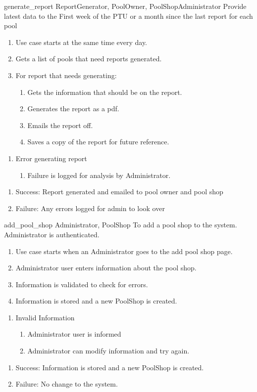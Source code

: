 \usecase
{generate\_report}
{ReportGenerator, PoolOwner, PoolShopAdministrator}
{Provide latest data to the }
{First week of the PTU or a month since the last report for each pool}
{
\begin{enumerate}
\item Use case starts at the same time every day.
\item Gets a list of pools that need reports generated.
\item For report that needs generating:
\begin{enumerate}
\item Gets the information that should be on the report.
\item Generates the report as a pdf.
\item Emails the report off.
\item Saves a copy of the report for future reference.
\end{enumerate}
\end{enumerate}
}
{
\begin{enumerate}
\item Error generating report
\begin{enumerate}
\item Failure is logged for analysis by Administrator.
\end{enumerate}
\end{enumerate}
}
{
\begin{enumerate}
\item Success: Report generated and emailed to pool owner and pool shop
\item Failure: Any errors logged for admin to look over
\end{enumerate}
}

\usecase
{add\_pool\_shop}
{Administrator, PoolShop}
{To add a pool shop to the system.}
{Administrator is authenticated.}
{
\begin{enumerate}
\item Use case starts when an Administrator goes to the add pool shop page.
\item Administrator user enters information about the pool shop.
\item Information is validated to check for errors.
\item Information is stored and a new PoolShop is created.
\end{enumerate}
}
{
\begin{enumerate}
\item Invalid Information
\begin{enumerate}
\item Administrator user is informed
\item Administrator can modify information and try again.
\end{enumerate}
\end{enumerate}
}
{
\begin{enumerate}
\item Success: Information is stored and a new PoolShop is created.
\item Failure: No change to the system.
\end{enumerate}
}

